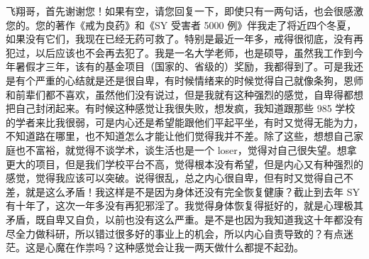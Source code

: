 \begin{case}
    飞翔哥，首先谢谢您！如果有空，请您回复一下，即使只有一两句话，也会很感激您的。您的著作《戒为良药》和《SY 受害者 5000 例》伴我走了将近四个冬夏，如果没有它们，我现在已经无药可救了。特别是最近一年多，戒得很彻底，没有再犯过，以后应该也不会再去犯了。我是一名大学老师，也是硕导，虽然我工作到今年暑假才三年，该有的基金项目（国家的、省级的）奖励，我都得到了。可是我还是有个严重的心结就是还是很自卑，有时候情绪来的时候觉得自己就像条狗，恩师和前辈们都不喜欢，虽然他们没有说过，但是我就有这种强烈的感觉，自卑得都想把自己封闭起来。有时候这种感觉让我很失败，想发疯，我知道跟那些 985 学校的学者来比我很弱，可是内心还是希望能跟他们平起平坐，有时又觉得无能为力，不知道路在哪里，也不知道怎么才能让他们觉得我并不差。除了这些，想想自己家庭也不富裕，就觉得不谈学术，谈生活也是一个 loser，觉得对自己很失望。想拿更大的项目，但是我们学校平台不高，觉得根本没有希望，但是内心又有种强烈的感觉，觉得我应该可以突破。说得很乱，总之内心很自卑，但有时又觉得自己不差，就是这么矛盾！我这样是不是因为身体还没有完全恢复健康？截止到去年 SY 有十年了，这次一年多没有再犯邪淫了。我觉得身体恢复得挺好的，就是心理极其矛盾，既自卑又自负，以前也没有这么严重。是不是也因为我知道我这十年都没有尽全力做科研，所以错过很多好的事业上的机会，所以内心自责导致的？有点迷茫。这是心魔在作祟吗？这种感觉会让我一两天做什么都提不起劲。

\end{case}

